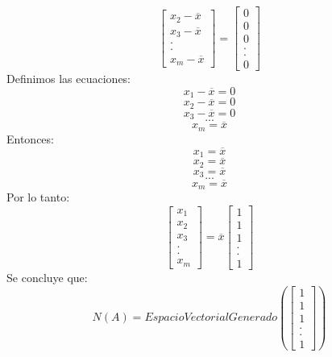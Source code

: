 \documentclass[12pt]{article}
\begin{document}
\begin{itemize}
\[\begin{bmatrix}
            x_2 - \overline{x} \\
            x_3 - \overline{x} \\
            .\\
            .\\
            x_m - \overline{x}
            \end{bmatrix} 
            =
            \begin{bmatrix}
            0\\
            0\\
            0\\
            .\\
            .\\
            0
            \end{bmatrix}
        \]
        Definimos las ecuaciones:
        \[
            x_1 - \overline{x} = 0
        \]
        \[
            x_2 - \overline{x} = 0
        \]
        \[
            x_3 - \overline{x} = 0
        \]
        \[...\]
        \[
            x_m = \overline{x} 
        \]
        Entonces:
        \[
            x_1 = \overline{x}
        \]
        \[
            x_2 = \overline{x}
        \]
        \[
            x_3 = \overline{x}
        \]
        \[...\]
        \[
            x_m = \overline{x}
        \]
        Por lo tanto:
        \[
           \begin{bmatrix}
            x_1\\
            x_2\\
            x_3\\
            .\\
            .\\
            x_m
            \end{bmatrix} 
            = \overline{x}
            \begin{bmatrix}
            1\\
            1\\
            1\\
            .\\
            .\\
            1
            \end{bmatrix}
        \]
        Se concluye que:
        \[
            N(A) = EspacioVectorialGenerado
                \left(\begin{bmatrix}
                1\\
                1\\
                1\\
                .\\
                .\\
                1
                \end{bmatrix}
                \right)
        \]
        
    \end{itemize}
    
\end{document}
